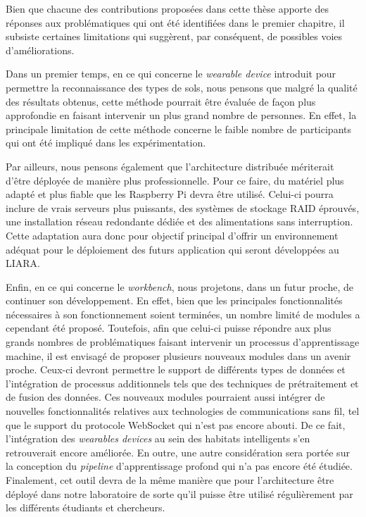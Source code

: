Bien que chacune des contributions proposées dans cette thèse apporte des réponses aux problématiques qui ont été identifiées dans le premier chapitre, il subsiste certaines limitations qui suggèrent, par conséquent, de possibles voies d'améliorations.

Dans un premier temps, en ce qui concerne le \textit{wearable device} introduit pour permettre la reconnaissance des types de sols, nous pensons que malgré la qualité des résultats obtenus, cette méthode pourrait être évaluée de façon plus approfondie en faisant intervenir un plus grand nombre de personnes. En effet, la principale limitation de cette méthode concerne le faible nombre de participants qui ont été impliqué dans les expérimentation.

Par ailleurs, nous pensons également que l'architecture distribuée mériterait d'être déployée de manière plus professionnelle. Pour ce faire, du matériel plus adapté et plus fiable que les Raspberry Pi devra être utilisé. Celui-ci pourra inclure de vrais serveurs plus puissants, des systèmes de stockage \acs{RAID} éprouvés, une installation réseau redondante dédiée et des alimentations sans interruption. Cette adaptation aura donc pour objectif principal d'offrir un environnement adéquat pour le déploiement des futurs application qui seront développées au \acs{LIARA}.

Enfin, en ce qui concerne le \textit{workbench}, nous projetons, dans un futur proche, de continuer son développement. En effet, bien que les principales fonctionnalités nécessaires à son fonctionnement soient terminées, un nombre limité de modules a cependant été proposé. Toutefois, afin que celui-ci puisse répondre aux plus grands nombres de problématiques faisant intervenir un processus d'apprentissage machine, il est envisagé de proposer plusieurs nouveaux modules dans un avenir proche. Ceux-ci devront permettre le support de différents types de données et l'intégration de processus additionnels tels que des techniques de prétraitement et de fusion des données. Ces nouveaux modules pourraient aussi intégrer de nouvelles fonctionnalités relatives aux technologies de communications sans fil, tel que le support du protocole WebSocket qui n'est pas encore abouti. De ce fait, l'intégration des \textit{wearables devices} au sein des habitats intelligents s'en retrouverait encore améliorée. En outre, une autre considération sera portée sur la conception du \textit{pipeline} d'apprentissage profond qui n'a pas encore été étudiée. Finalement, cet outil devra de la même manière que pour l'architecture être déployé dans notre laboratoire de sorte qu'il puisse être utilisé régulièrement par les différents étudiants et chercheurs.

